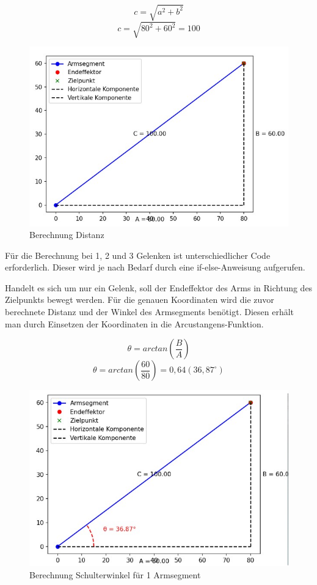 \documentclass[12pt]{article}
\begin{document}
    \[
        c = \sqrt{a^2 + b^2}
    \]
    \[
        c = \sqrt{80^2 + 60^2} = 100
    \]

    \begin{figure}[h]
        \centering
        \includegraphics[width = \linewidth]{Bild 1}
        \caption{Berechnung Distanz}
    \end{figure}

    

    Für die Berechnung bei 1, 2 und 3 Gelenken ist unterschiedlicher Code erforderlich. Dieser wird je
    nach Bedarf durch eine if-else-Anweisung aufgerufen.

    Handelt es sich um nur ein Gelenk, soll der Endeffektor des Arms in Richtung des Zielpunkts
    bewegt werden. Für die genauen Koordinaten wird die zuvor berechnete Distanz und der Winkel des
    Armsegments benötigt. Diesen erhält man durch Einsetzen der Koordinaten in die
    Arcustangens-Funktion.

    \[
        \theta=arctan(\frac{B}{A})
    \]
    \[
        \theta=arctan(\frac{60}{80})=0,64 (36,87^\circ)
    \]

    \begin{figure}[h]
        \centering
        \includegraphics[width = \linewidth]{Bild 2}
        \caption{Berechnung Schulterwinkel für 1 Armsegment}
    \end{figure}
\end{document}
